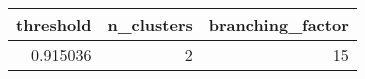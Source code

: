 \begin{tabular}{rrr}
\toprule
threshold & n_clusters & branching_factor \\
\midrule
0.915036 & 2 & 15 \\
\bottomrule
\end{tabular}
